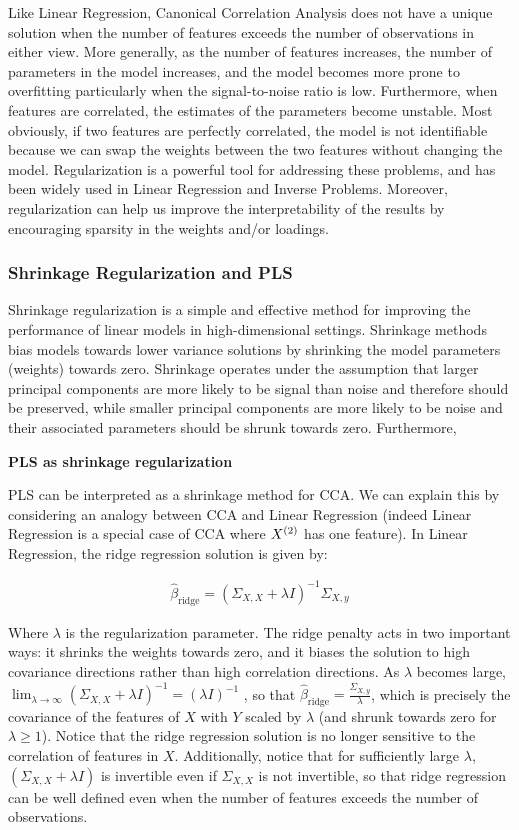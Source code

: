 Like Linear Regression, Canonical Correlation Analysis does not have a unique solution when the number of features exceeds the number of observations in either view.
More generally, as the number of features increases, the number of parameters in the model increases, and the model becomes more prone to overfitting particularly when the signal-to-noise ratio is low.
Furthermore, when features are correlated, the estimates of the parameters become unstable.
Most obviously, if two features are perfectly correlated, the model is not identifiable because we can swap the weights between the two features without changing the model.
Regularization is a powerful tool for addressing these problems, and has been widely used in Linear Regression and Inverse Problems.
Moreover, regularization can help us improve the interpretability of the results by encouraging sparsity in the weights and/or loadings.

\subsubsection{Shrinkage Regularization and PLS}

Shrinkage regularization is a simple and effective method for improving the performance of linear models in high-dimensional settings.
Shrinkage methods bias models towards lower variance solutions by shrinking the model parameters (weights) towards zero.
Shrinkage operates under the assumption that larger principal components are more likely to be signal than noise and therefore should be preserved, while smaller principal components are more likely to be noise and their associated parameters should be shrunk towards zero.
Furthermore,

\textbf{PLS as shrinkage regularization}

PLS can be interpreted as a shrinkage method for CCA.
We can explain this by considering an analogy between CCA and Linear Regression (indeed Linear Regression is a special case of CCA where $X^{(2)}$ has one feature).
In Linear Regression, the ridge regression solution is given by:

\begin{align}
    \hat{\beta}_{\text{ridge}} = (\Sigma_{X,X} + \lambda I)^{-1} \Sigma_{X,y}
\end{align}

Where $\lambda$ is the regularization parameter.
The ridge penalty acts in two important ways: it shrinks the weights towards zero, and it biases the solution to high covariance directions rather than high correlation directions.
As $\lambda$ becomes large, $\lim_{\lambda \to \infty} (\Sigma_{X,X} + \lambda I)^{-1} = (\lambda I)^{-1}$
, so that $\hat{\beta}_{\text{ridge}}=\frac{\Sigma_{X,y}}{\lambda}$, which is precisely the covariance of the features of $X$ with $Y$ scaled by $\lambda$ (and shrunk towards zero for $\lambda \geq 1$).
Notice that the ridge regression solution is no longer sensitive to the correlation of features in $X$.
Additionally, notice that for sufficiently large $\lambda$, $(\Sigma_{X,X} + \lambda I)$ is invertible even if $\Sigma_{X,X}$ is not invertible, so that ridge regression can be well defined even when the number of features exceeds the number of observations.

